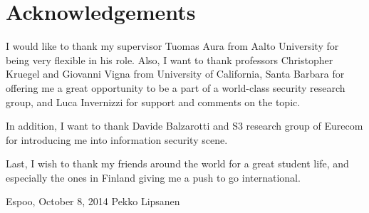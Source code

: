 \documentclass[12pt,a4paper,oneside,pdftex]{report}
\newcommand{\DATE}{October 8, 2014}
\newcommand{\AUTHOR}{Pekko Lipsanen}
\begin{document}


\chapter*{Acknowledgements}

I would like to thank my supervisor Tuomas Aura from Aalto University for being very flexible in his role. Also, I want to thank professors Christopher Kruegel and Giovanni Vigna from University of California, Santa Barbara for offering me a great opportunity to be a part of a world-class security research group, and Luca Invernizzi for support and comments on the topic.

In addition, I want to thank Davide Balzarotti and S3 research group of Eurecom for introducing me into information security scene.

Last, I wish to thank my friends around the world for a great student life, and especially the ones in Finland giving me a push to go international.

\vskip 10mm

\noindent Espoo, \DATE
\vskip 5mm
\noindent\AUTHOR

\cleardoublepage


\cleardoublepage
\tableofcontents

\end{document}
